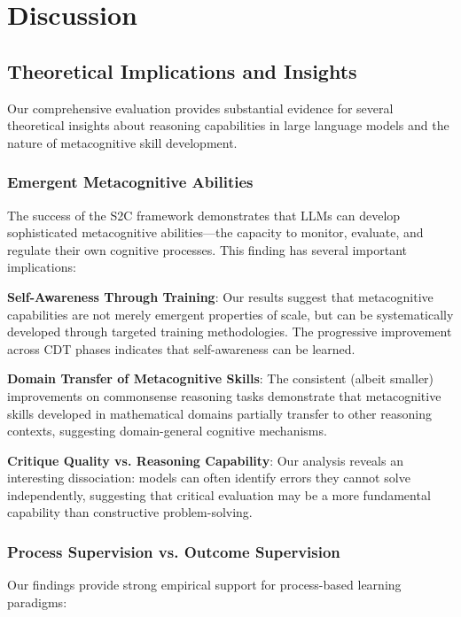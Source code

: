 \documentclass[10pt,twocolumn]{article}
\newcommand{\ssc}{\textsc{S2C}}
\newcommand{\cdt}{\textsc{CDT}}
\begin{document}
\section{Discussion} \label{sec:discussion}

\subsection{Theoretical Implications and Insights}

Our comprehensive evaluation provides substantial evidence for several theoretical insights about reasoning capabilities in large language models and the nature of metacognitive skill development.

\subsubsection{Emergent Metacognitive Abilities}

The success of the \ssc{} framework demonstrates that LLMs can develop sophisticated metacognitive abilities—the capacity to monitor, evaluate, and regulate their own cognitive processes. This finding has several important implications:

\textbf{Self-Awareness Through Training}: Our results suggest that metacognitive capabilities are not merely emergent properties of scale, but can be systematically developed through targeted training methodologies. The progressive improvement across \cdt{} phases indicates that self-awareness can be learned.

\textbf{Domain Transfer of Metacognitive Skills}: The consistent (albeit smaller) improvements on commonsense reasoning tasks demonstrate that metacognitive skills developed in mathematical domains partially transfer to other reasoning contexts, suggesting domain-general cognitive mechanisms.

\textbf{Critique Quality vs. Reasoning Capability}: Our analysis reveals an interesting dissociation: models can often identify errors they cannot solve independently, suggesting that critical evaluation may be a more fundamental capability than constructive problem-solving.

\subsubsection{Process Supervision vs. Outcome Supervision}

Our findings provide strong empirical support for process-based learning paradigms:
\end{document}
